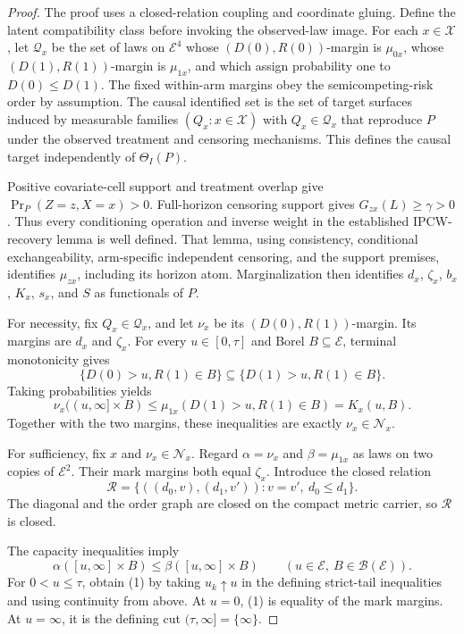 \documentclass{article}
\begin{document}
\begin{proof}
The proof uses a closed-relation coupling and coordinate gluing.  Define the latent compatibility class before invoking the observed-law image.  For each \(x\in\mathcal X\), let \(\mathcal Q_x\) be the set of laws on \(\mathcal E^4\) whose \((D(0),R(0))\)-margin is \(\mu_{0x}\), whose \((D(1),R(1))\)-margin is \(\mu_{1x}\), and which assign probability one to \(D(0)\leq D(1)\).  The fixed within-arm margins obey the semicompeting-risk order by assumption.  The causal identified set is the set of target surfaces induced by measurable families \((Q_x:x\in\mathcal X)\) with \(Q_x\in\mathcal Q_x\) that reproduce \(P\) under the observed treatment and censoring mechanisms.  This defines the causal target independently of \(\Theta_I(P)\).

Positive covariate-cell support and treatment overlap give \(\Pr_P(Z=z,X=x)>0\).  Full-horizon censoring support gives \(G_{zx}(L)\geq\gamma>0\).  Thus every conditioning operation and inverse weight in the established IPCW-recovery lemma is well defined.  That lemma, using consistency, conditional exchangeability, arm-specific independent censoring, and the support premises, identifies \(\mu_{zx}\), including its horizon atom.  Marginalization then identifies \(d_x\), \(\zeta_x\), \(b_x\), \(K_x\), \(s_x\), and \(S\) as functionals of \(P\).

For necessity, fix \(Q_x\in\mathcal Q_x\), and let \(\nu_x\) be its \((D(0),R(1))\)-margin.  Its margins are \(d_x\) and \(\zeta_x\).  For every \(u\in[0,\tau]\) and Borel \(B\subseteq\mathcal E\), terminal monotonicity gives
\[
\{D(0)>u,R(1)\in B\}
\subseteq
\{D(1)>u,R(1)\in B\}.
\]
Taking probabilities yields
\[
\nu_x((u,\infty]\times B)
\leq\mu_{1x}(D(1)>u,R(1)\in B)=K_x(u,B).
\]
Together with the two margins, these inequalities are exactly \(\nu_x\in\mathcal N_x\).

For sufficiency, fix \(x\) and \(\nu_x\in\mathcal N_x\).  Regard \(\alpha=\nu_x\) and \(\beta=\mu_{1x}\) as laws on two copies of \(\mathcal E^2\).  Their mark margins both equal \(\zeta_x\).  Introduce the closed relation
\[
\mathcal R=\{((d_0,v),(d_1,v')):v=v',\ d_0\leq d_1\}.
\]
The diagonal and the order graph are closed on the compact metric carrier, so \(\mathcal R\) is closed.

The capacity inequalities imply
\[
\alpha([u,\infty]\times B)\leq\beta([u,\infty]\times B)
\qquad(u\in\mathcal E,\ B\in\mathscr B(\mathcal E)).                \tag{1}
\]
For \(0<u\leq\tau\), obtain (1) by taking \(u_k\uparrow u\) in the defining strict-tail inequalities and using continuity from above.  At \(u=0\), (1) is equality of the mark margins.  At \(u=\infty\), it is the defining cut \((\tau,\infty]=\{\infty\}\).


\end{proof}
\end{document}
